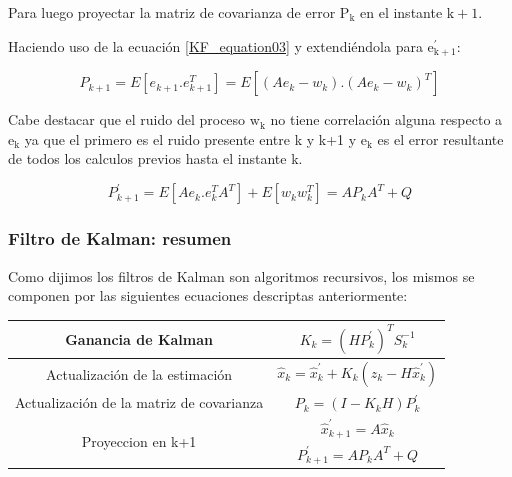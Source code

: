 \documentclass[10pt,a4paper]{article}
\begin{document}
    \noindent Para luego proyectar la matriz de covarianza de error
    $\mathrm{P_k}$ en el instante $\mathrm{k+1}$.
	
	\noindent Haciendo uso de la ecuación \ref{KF_equation03} y extendiéndola 
    para $\mathrm{e^\prime_{k+1}}$:
	
	\begin{figure}[h!]
		\begin{center}
			\begin{equation}
				P_{k+1} = E[e_{k+1}.e_{k+1}^{T}] = E[(A e_k-w_k).(A  e_k-w_k)^{T}]
				\label{projection_p_k_aux}
			\end{equation}	
		\end{center}
	\end{figure}
	
    \noindent Cabe destacar que el ruido del proceso $\mathrm{w_k}$ no tiene 
    correlación alguna respecto a $\mathrm{e_k}$ ya que el primero es el ruido 
    presente entre k y k+1 y $\mathrm{e_k}$ es el error resultante de todos los 
    calculos previos hasta el instante k.
	
	\begin{figure}[h!]
		\begin{center}
			\begin{equation}
				P^\prime_{k+1} = E[A e_{k}.e_{k}^{T}A^{T}]+ E[w_k w_k^{T}]= A P_k A^{T} + Q
				\label{projection_p_k}
			\end{equation}	
		\end{center}
	\end{figure}
	
	\clearpage
	
	\subsubsection{Filtro de Kalman: resumen}
	
	Como dijimos los filtros de Kalman son algoritmos recursivos, los mismos se 
    componen por las siguientes ecuaciones descriptas anteriormente:
	
	\begin{table}[h!]
		\centering
		\begin{tabular}{|c|c|}
			\hline
			\rule{0pt}{4ex}	Ganancia de Kalman 							& $K_k = (H P^\prime_k)^T S_k^{-1}$  \\ \hline
			\rule{0pt}{4ex}	Actualización de la estimación			    &  $\hat{x}_k = \hat{x}^\prime_k + K_k (z_k - H\hat{x}^\prime_k)$\\ \hline
			\rule{0pt}{4ex}	Actualización de la matriz de covarianza    & $P_k = (I - K_k H) P^\prime_k$ \\ \hline
			\multirow{2}{*}{Proyeccion en k+1}        		  			& \rule{0pt}{4ex} $\hat{x}^\prime_{k+1} = A \hat{x}_k$ \\ \cline{2-2}
			& \rule{0pt}{4ex} $P^\prime_{k+1} = A P_k A^{T} + Q$ \\ \hline
		\end{tabular}
		\label{Ecuaciones_Kalman}
	\end{table}
	
\end{document}
